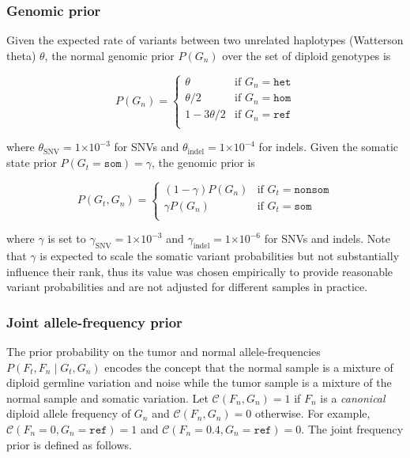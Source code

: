 \documentclass{article}
\newcommand{\e}[1]{\ensuremath{\times 10^{#1}}}
\begin{document}
\subsubsection{Genomic prior}
Given the expected rate of variants between two unrelated haplotypes (Watterson theta) $\theta$, the normal genomic prior $P(G_n)$ over the set of diploid genotypes is

\begin{equation*}
P(G_n)=
\begin{cases}
	\theta & \text{if } G_n = \texttt{het} \\
	\theta/2 & \text{if } G_n = \texttt{hom} \\
	1 - 3\theta/2 & \text{if } G_n = \texttt{ref} \\
\end{cases}
\end{equation*}

\noindent where $\theta_{\text{SNV}}=1\e{-3}$ for SNVs and $\theta_{\text{indel}}=1\e{-4}$ for indels. Given the somatic state prior $P(G_t=\texttt{som}) = \gamma$, the genomic prior is

\begin{equation*}
P(G_t, G_n)=
\begin{cases}
	(1 - \gamma) P(G_n) & \text{if } G_t = \texttt{nonsom} \\
	\gamma P(G_n) & \text{if } G_t = \texttt{som} \\
\end{cases}
\end{equation*}

\noindent where $\gamma$ is set to $\gamma_{\text{SNV}} = 1\e{-3}$ and $\gamma_{\text{indel}} = 1\e{-6}$ for SNVs and indels. Note that $\gamma$ is expected to scale the somatic variant probabilities but not substantially influence their rank, thus its value was chosen empirically to provide reasonable variant probabilities and are not adjusted for different samples in practice.


\subsubsection{Joint allele-frequency prior}
The prior probability on the tumor and normal allele-frequencies $P(F_t, F_n \mid G_t, G_n)$ encodes the concept that the normal sample is a mixture of diploid germline variation and noise while the tumor sample is a mixture of the normal sample and somatic variation. Let $\mathcal{C} (F_n, G_n) = 1$ if $F_n$ is a {\em canonical} diploid allele frequency of $G_n$ and $\mathcal{C} (F_n, G_n) = 0$ otherwise. For example, $\mathcal{C} (F_n=0, G_n = \texttt{ref}) = 1$ and $\mathcal{C} (F_n=0.4, G_n = \texttt{ref}) = 0$. The joint frequency prior is defined as follows.
\end{document}
